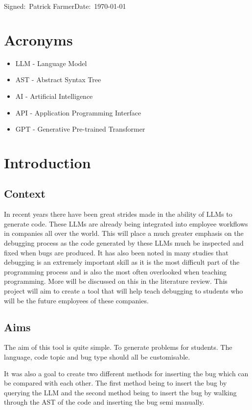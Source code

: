 \documentclass[12pt]{extarticle}
\begin{document}
\small Signed:~Patrick Farmer\hfill Date:~\today

\newpage
\tableofcontents

\newpage
\section{Acronyms}

\begin{itemize}
    \item LLM - Language Model
    \item AST - Abstract Syntax Tree
    \item AI - Artificial Intelligence
    \item API - Application Programming Interface
    \item GPT - Generative Pre-trained Transformer
\end{itemize}
\newpage
\section{Introduction}

\subsection{Context}

In recent years there have been great strides made in the ability of LLMs to generate code. These LLMs are already being integrated into employee workflows in companies all over the world. This will place a much greater emphasis on the debugging process as the code generated by these LLMs much be inspected and fixed when bugs are produced. It has also been noted in many studies that debugging is an extremely important skill as it is the most difficult part of the programming process and is also the most often overlooked when teaching programming. More will be discussed on this in the literature review. This project will aim to create a tool that will help teach debugging to students who will be the future employees of these companies. 

\subsection{Aims}

The aim of this tool is quite simple. To generate problems for students. The language, code topic and bug type should all be customisable. 

It was also a goal to create two different methods for inserting the bug which can be compared with each other. The first method being to insert the bug by querying the LLM and the second method being to insert the bug by walking through the AST of the code and inserting the bug semi manually.
\end{document}
